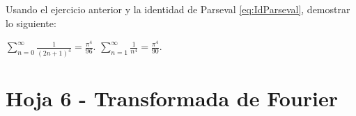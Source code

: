 \begin{problem} Usando el ejercicio anterior y la identidad de Parseval \eqref{eq:IdParseval}, demostrar lo siguiente:

\ppart $\sum_{n=0}^∞ \frac{1}{(2n+1)^4} = \frac{π^4}{96}$.
\ppart $\sum_{n=1}^∞ \frac{1}{n^4} = \frac{π^4}{90}$.

\solution
\end{problem}


\section{Hoja 6 - Transformada de Fourier}
